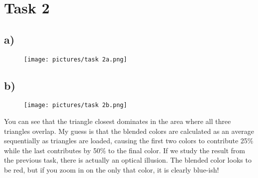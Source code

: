 \section{Task 2}

\subsection{a)}
\begin{figure}[h!]
    \centering
    \texttt{[image: pictures/task 2a.png]}
\end{figure}

\subsection{b)}
\begin{figure}[h!]
    \centering
    \texttt{[image: pictures/task 2b.png]}
\end{figure}
You can see that the triangle closest dominates in the area where all three triangles overlap. My guess is that the blended colors are calculated as an average sequentially as triangles are loaded, causing the first two colors to contribute 25\% while the last contributes by 50\% to the final color.
If we study the result from the previous task, there is actually an optical illusion. The blended color looks to be red, but if you zoom in on the only that color, it is clearly blue-ish!


        

